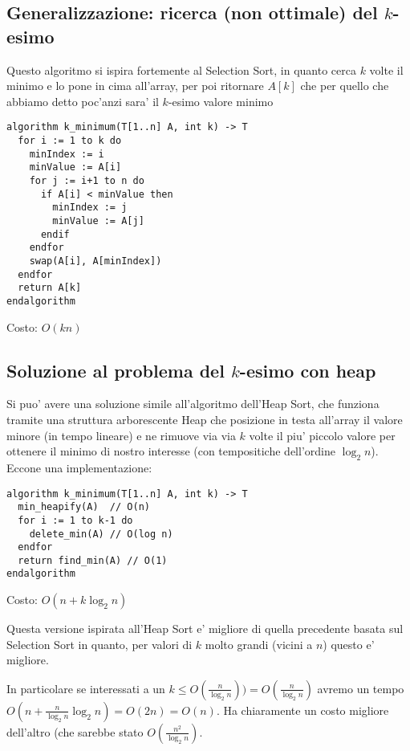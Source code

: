 \documentclass{article}
\begin{document}
\subsection{Generalizzazione: ricerca (non ottimale) del $k$-esimo}

Questo algoritmo si ispira fortemente al Selection Sort, in quanto cerca $k$
volte il minimo e lo pone in cima all'array, per poi ritornare $A[k]$ che per
quello che abbiamo detto poc'anzi sara' il $k$-esimo valore minimo

\begin{lstlisting}
algorithm k_minimum(T[1..n] A, int k) -> T
  for i := 1 to k do
    minIndex := i
    minValue := A[i]
    for j := i+1 to n do
      if A[i] < minValue then
        minIndex := j
        minValue := A[j]
      endif
    endfor
    swap(A[i], A[minIndex])
  endfor
  return A[k]
endalgorithm
\end{lstlisting}

Costo: $O(kn)$

\subsection{Soluzione al problema del $k$-esimo con heap}

Si puo' avere una soluzione simile all'algoritmo dell'Heap Sort, che funziona
tramite una struttura arborescente Heap che posizione in testa all'array il
valore minore (in tempo lineare) e ne rimuove via via $k$ volte il piu' piccolo
valore per ottenere il minimo di nostro interesse (con tempositiche dell'ordine
$\log_2 n$). Eccone una implementazione:

\begin{lstlisting}
algorithm k_minimum(T[1..n] A, int k) -> T
  min_heapify(A)  // O(n)
  for i := 1 to k-1 do
    delete_min(A) // O(log n)
  endfor
  return find_min(A) // O(1)
endalgorithm
\end{lstlisting}

Costo: $O(n + k \log_2 n)$

Questa versione ispirata all'Heap Sort e' migliore di quella precedente basata
sul Selection Sort in quanto, per valori di $k$ molto grandi (vicini a $n$)
questo e' migliore.

In particolare se interessati a un $k \leq O(\frac{n} {\log_2 n})) = O(\frac{n}
{\log_2 n})$ avremo un tempo $O(n + \frac{n}{\log_2 n} \log_2 n) = O(2n) = O(n)$.
Ha chiaramente un costo migliore dell'altro (che sarebbe stato $O(\frac{n^2}
{\log_2 n})$.
\end{document}
